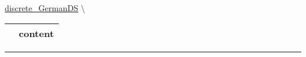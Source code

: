 \hypertarget{ecldoc:logisticregression.validation.discrete_germands.content}{}
\hspace{0pt} \hyperlink{ecldoc:LogisticRegression.validation.discrete_GermanDS}{discrete_GermanDS} \textbackslash 

{\renewcommand{\arraystretch}{1.5}
\begin{tabularx}{\textwidth}{|>{\raggedright\arraybackslash}l|X|}
\hline
\hspace{0pt}\mytexttt{\color{red} } & \textbf{content} \\
\hline
\end{tabularx}
}

\par


\rule{\linewidth}{0.5pt}


